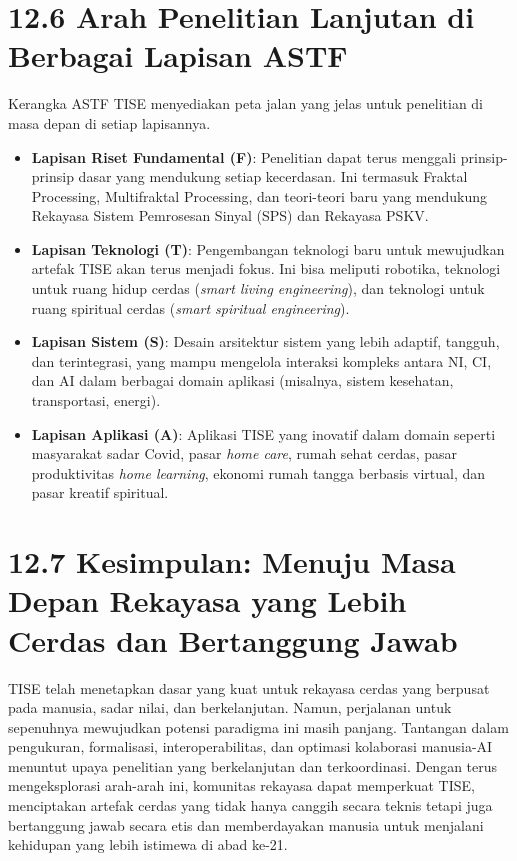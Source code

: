\documentclass[
  letterpaper,
  DIV=11,
  numbers=noendperiod]{scrreprt}
\providecommand{\tightlist}{%
  \setlength{\itemsep}{0pt}\setlength{\parskip}{0pt}}
\begin{document}
\section{\texorpdfstring{\textbf{12.6 Arah Penelitian Lanjutan di
Berbagai Lapisan
ASTF}}{12.6 Arah Penelitian Lanjutan di Berbagai Lapisan ASTF}}\label{arah-penelitian-lanjutan-di-berbagai-lapisan-astf}

Kerangka ASTF TISE menyediakan peta jalan yang jelas untuk penelitian di
masa depan di setiap lapisannya.

\begin{itemize}
\tightlist
\item
  \textbf{Lapisan Riset Fundamental (F)}: Penelitian dapat terus
  menggali prinsip-prinsip dasar yang mendukung setiap kecerdasan. Ini
  termasuk Fraktal Processing, Multifraktal Processing, dan teori-teori
  baru yang mendukung Rekayasa Sistem Pemrosesan Sinyal (SPS) dan
  Rekayasa PSKV.
\item
  \textbf{Lapisan Teknologi (T)}: Pengembangan teknologi baru untuk
  mewujudkan artefak TISE akan terus menjadi fokus. Ini bisa meliputi
  robotika, teknologi untuk ruang hidup cerdas (\emph{smart living
  engineering}), dan teknologi untuk ruang spiritual cerdas (\emph{smart
  spiritual engineering}).
\item
  \textbf{Lapisan Sistem (S)}: Desain arsitektur sistem yang lebih
  adaptif, tangguh, dan terintegrasi, yang mampu mengelola interaksi
  kompleks antara NI, CI, dan AI dalam berbagai domain aplikasi
  (misalnya, sistem kesehatan, transportasi, energi).
\item
  \textbf{Lapisan Aplikasi (A)}: Aplikasi TISE yang inovatif dalam
  domain seperti masyarakat sadar Covid, pasar \emph{home care}, rumah
  sehat cerdas, pasar produktivitas \emph{home learning}, ekonomi rumah
  tangga berbasis virtual, dan pasar kreatif spiritual.
\end{itemize}

\section{\texorpdfstring{\textbf{12.7 Kesimpulan: Menuju Masa Depan
Rekayasa yang Lebih Cerdas dan Bertanggung
Jawab}}{12.7 Kesimpulan: Menuju Masa Depan Rekayasa yang Lebih Cerdas dan Bertanggung Jawab}}\label{kesimpulan-menuju-masa-depan-rekayasa-yang-lebih-cerdas-dan-bertanggung-jawab}

TISE telah menetapkan dasar yang kuat untuk rekayasa cerdas yang
berpusat pada manusia, sadar nilai, dan berkelanjutan. Namun, perjalanan
untuk sepenuhnya mewujudkan potensi paradigma ini masih panjang.
Tantangan dalam pengukuran, formalisasi, interoperabilitas, dan optimasi
kolaborasi manusia-AI menuntut upaya penelitian yang berkelanjutan dan
terkoordinasi. Dengan terus mengeksplorasi arah-arah ini, komunitas
rekayasa dapat memperkuat TISE, menciptakan artefak cerdas yang tidak
hanya canggih secara teknis tetapi juga bertanggung jawab secara etis
dan memberdayakan manusia untuk menjalani kehidupan yang lebih istimewa
di abad ke-21.
\end{document}
